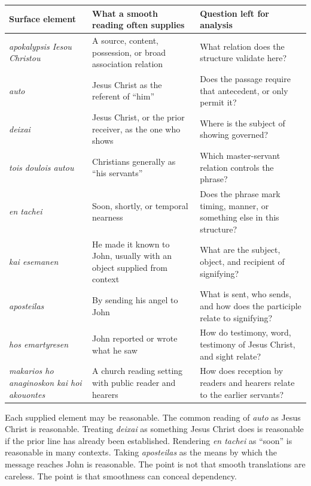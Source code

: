 \begin{center}
\begin{longtable}{L{0.26\textwidth}L{0.31\textwidth}L{0.33\textwidth}}
\toprule
Surface element & What a smooth reading often supplies & Question left for analysis \\
\midrule
\textit{apokalypsis Iesou Christou} & A source, content, possession, or broad association relation & What relation does the structure validate here? \\
\textit{auto} & Jesus Christ as the referent of ``him'' & Does the passage require that antecedent, or only permit it? \\
\textit{deixai} & Jesus Christ, or the prior receiver, as the one who shows & Where is the subject of showing governed? \\
\textit{tois doulois autou} & Christians generally as ``his servants'' & Which master-servant relation controls the phrase? \\
\textit{en tachei} & Soon, shortly, or temporal nearness & Does the phrase mark timing, manner, or something else in this structure? \\
\textit{kai esemanen} & He made it known to John, usually with an object supplied from context & What are the subject, object, and recipient of signifying? \\
\textit{aposteilas} & By sending his angel to John & What is sent, who sends, and how does the participle relate to signifying? \\
\textit{hos emartyresen} & John reported or wrote what he saw & How do testimony, word, testimony of Jesus Christ, and sight relate? \\
\textit{makarios ho anaginoskon kai hoi akouontes} & A church reading setting with public reader and hearers & How does reception by readers and hearers relate to the earlier servants? \\
\bottomrule
\end{longtable}
\end{center}

Each supplied element may be reasonable. The common reading of \textit{auto} as Jesus Christ is reasonable. Treating \textit{deixai} as something Jesus Christ does is reasonable if the prior line has already been established. Rendering \textit{en tachei} as ``soon'' is reasonable in many contexts. Taking \textit{aposteilas} as the means by which the message reaches John is reasonable. The point is not that smooth translations are careless. The point is that smoothness can conceal dependency.

